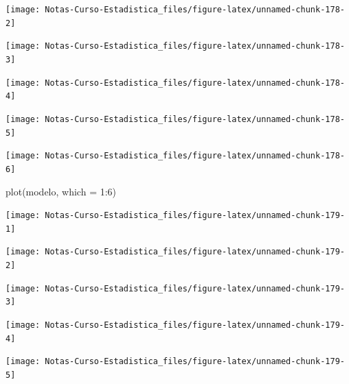\documentclass[
  12pt,
]{book}
\newenvironment{Shaded}{\begin{snugshade}}{\end{snugshade}}
\newcommand{\AttributeTok}[1]{\textcolor[rgb]{0.77,0.63,0.00}{#1}}
\newcommand{\DecValTok}[1]{\textcolor[rgb]{0.00,0.00,0.81}{#1}}
\newcommand{\FunctionTok}[1]{\textcolor[rgb]{0.00,0.00,0.00}{#1}}
\newcommand{\NormalTok}[1]{#1}
\newcommand{\SpecialCharTok}[1]{\textcolor[rgb]{0.00,0.00,0.00}{#1}}
\theoremstyle{definition}
\theoremstyle{definition}
\theoremstyle{definition}
\theoremstyle{definition}
\theoremstyle{remark}
\begin{document}
\begin{center}\texttt{[image: Notas-Curso-Estadistica\_files/figure-latex/unnamed-chunk-178-2]} \end{center}

\begin{center}\texttt{[image: Notas-Curso-Estadistica\_files/figure-latex/unnamed-chunk-178-3]} \end{center}

\begin{center}\texttt{[image: Notas-Curso-Estadistica\_files/figure-latex/unnamed-chunk-178-4]} \end{center}

\begin{center}\texttt{[image: Notas-Curso-Estadistica\_files/figure-latex/unnamed-chunk-178-5]} \end{center}

\begin{center}\texttt{[image: Notas-Curso-Estadistica\_files/figure-latex/unnamed-chunk-178-6]} \end{center}

\begin{Shaded}
\begin{Highlighting}[]
\FunctionTok{plot}\NormalTok{(modelo, }\AttributeTok{which =} \DecValTok{1}\SpecialCharTok{:}\DecValTok{6}\NormalTok{)}
\end{Highlighting}
\end{Shaded}

\begin{center}\texttt{[image: Notas-Curso-Estadistica\_files/figure-latex/unnamed-chunk-179-1]} \end{center}

\begin{center}\texttt{[image: Notas-Curso-Estadistica\_files/figure-latex/unnamed-chunk-179-2]} \end{center}

\begin{center}\texttt{[image: Notas-Curso-Estadistica\_files/figure-latex/unnamed-chunk-179-3]} \end{center}

\begin{center}\texttt{[image: Notas-Curso-Estadistica\_files/figure-latex/unnamed-chunk-179-4]} \end{center}

\begin{center}\texttt{[image: Notas-Curso-Estadistica\_files/figure-latex/unnamed-chunk-179-5]} \end{center}
\end{document}
